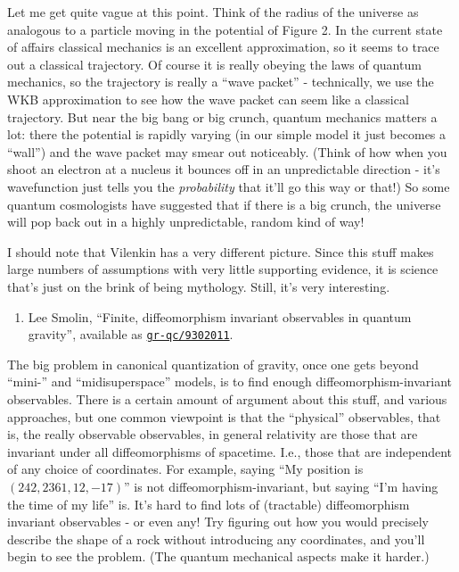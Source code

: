\documentclass{article}
\def\tightlist{}
\begin{document}
Let me get quite vague at this point. Think of the radius of the
universe as analogous to a particle moving in the potential of Figure 2.
In the current state of affairs classical mechanics is an excellent
approximation, so it seems to trace out a classical trajectory. Of
course it is really obeying the laws of quantum mechanics, so the
trajectory is really a ``wave packet'' - technically, we use the WKB
approximation to see how the wave packet can seem like a classical
trajectory. But near the big bang or big crunch, quantum mechanics
matters a lot: there the potential is rapidly varying (in our simple
model it just becomes a ``wall'') and the wave packet may smear out
noticeably. (Think of how when you shoot an electron at a nucleus it
bounces off in an unpredictable direction - it's wavefunction just tells
you the \emph{probability} that it'll go this way or that!) So some
quantum cosmologists have suggested that if there is a big crunch, the
universe will pop back out in a highly unpredictable, random kind of
way!

I should note that Vilenkin has a very different picture. Since this
stuff makes large numbers of assumptions with very little supporting
evidence, it is science that's just on the brink of being mythology.
Still, it's very interesting.

\begin{enumerate}
\def\labelenumi{\arabic{enumi})}
\setcounter{enumi}{1}
\tightlist
\item
  Lee Smolin, ``Finite, diffeomorphism invariant observables in quantum
  gravity'', available as
  \href{http://xxx.lanl.gov/abs/gr-qc/9302011}{\texttt{gr-qc/9302011}}.
\end{enumerate}

The big problem in canonical quantization of gravity, once one gets
beyond ``mini-'' and ``midisuperspace'' models, is to find enough
diffeomorphism-invariant observables. There is a certain amount of
argument about this stuff, and various approaches, but one common
viewpoint is that the ``physical'' observables, that is, the really
observable observables, in general relativity are those that are
invariant under all diffeomorphisms of spacetime. I.e., those that are
independent of any choice of coordinates. For example, saying ``My
position is \((242,2361,12,-17)\)'' is not diffeomorphism-invariant, but
saying ``I'm having the time of my life'' is. It's hard to find lots of
(tractable) diffeomorphism invariant observables - or even any! Try
figuring out how you would precisely describe the shape of a rock
without introducing any coordinates, and you'll begin to see the
problem. (The quantum mechanical aspects make it harder.)
\end{document}
